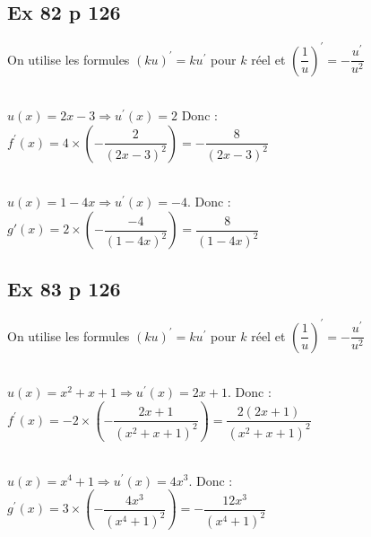 \documentclass[12pt,a5paper]{book}
\begin{document}
\subsection*{Ex 82 p 126}
On utilise les formules $(k u)^{\prime}=k u^{\prime}$ pour $k$ réel et $\left(\dfrac{1}{u}\right)^{\prime}=-\dfrac{u^{\prime}}{u^{2}}$
\begin{enumMet}
    \item {}\\
    $u(x)=2 x-3 \Rightarrow u^{\prime}(x)=2$
Donc :\\
$f^{\prime}(x)=4 \times\left(-\dfrac{2}{(2 x-3)^{2}}\right)=-\dfrac{8}{(2 x-3)^{2}}$
    \item {}\\
    $u(x)=1-4 x \Rightarrow u^{\prime}(x)=-4$.
Donc :\\
$g'(x)=2 \times\left(-\dfrac{-4}{(1-4 x)^{2}}\right)=\dfrac{8}{(1-4 x)^{2}}$
\end{enumMet}

\subsection*{Ex 83 p 126}
On utilise les formules $(k u)^{\prime}=k u^{\prime}$ pour $k$ réel et $\left(\dfrac{1}{u}\right)^{\prime}=-\dfrac{u^{\prime}}{u^{2}}$
\begin{enumMet}
    \item {}\\
$u(x)=x^{2}+x+1 \Rightarrow u^{\prime}(x)=2 x+1$. Donc : \\
$f^{\prime}(x)=-2 \times\left(-\dfrac{2 x+1}{\left(x^{2}+x+1\right)^{2}}\right)=\dfrac{2(2 x+1)}{\left(x^{2}+x+1\right)^{2}}$
    \item {}\\
$u(x)=x^{4}+1 \Rightarrow u^{\prime}(x)=4 x^{3}$. Donc :\\ 
$g^{\prime}(x)=3 \times\left(-\dfrac{4 x^{3}}{\left(x^{4}+1\right)^{2}}\right)=-\dfrac{12 x^{3}}{\left(x^{4}+1\right)^{2}}$
\end{enumMet}
\end{document}

